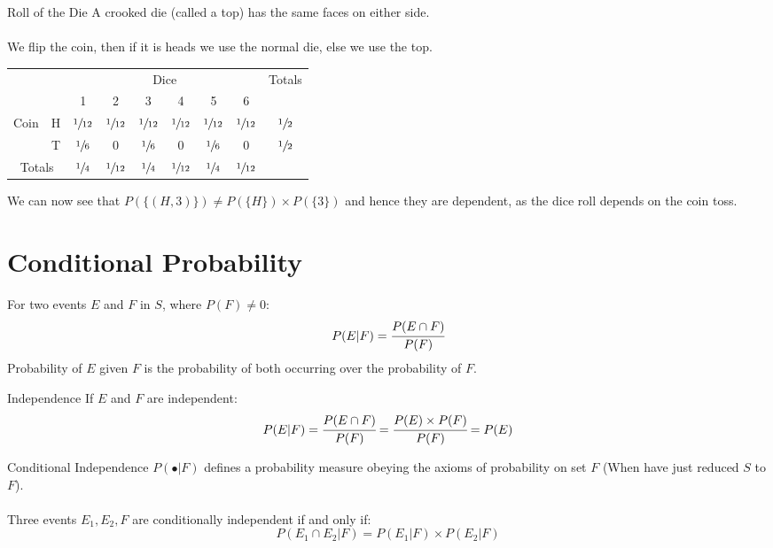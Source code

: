 \begin{examplebox}{Roll of the Die}
    A crooked die (called a top) has the same faces on either side.
    \\
    \\ We flip the coin, then if it is heads we use the normal die, else we use the top.
    \begin{center}
        \begin{tabular}{c c c c c c c c c}
            \setlength{\tabcolsep}{3em}
                                    &                & \multicolumn{6}{c}{Dice} & \multirow{2}{*}{Totals}                                                                                          \\
                                    &                & 1                        & 2                       & 3               & 4               & 5               & 6               &                \\
            \multirow{2}{*}{Coin}      & H              & $\sfrac{1}{12}$          & $\sfrac{1}{12}$         & $\sfrac{1}{12}$ & $\sfrac{1}{12}$ & $\sfrac{1}{12}$ & $\sfrac{1}{12}$ & $\sfrac{1}{2}$ \\
                                    & T              & $\sfrac{1}{6}$           & $0$                     & $\sfrac{1}{6}$  & $0$             & $\sfrac{1}{6}$  & $0$             & $\sfrac{1}{2}$ \\
            \multicolumn{2}{c}{Totals} & $\sfrac{1}{4}$ & $\sfrac{1}{12}$          & $\sfrac{1}{4}$          & $\sfrac{1}{12}$ & $\sfrac{1}{4}$  & $\sfrac{1}{12}$ &                                  \\
        \end{tabular}
    \end{center}
    We can now see that $P(\{(H,3)\}) \neq P(\{H\}) \times P(\{3\})$ and hence they are dependent, as the dice roll depends on the coin toss.
\end{examplebox}

\section{Conditional Probability}
For two events $E$ and $F$ in  $S$, where $P(F) \neq 0$:
\[P(E|F) = \cfrac{P(E \cap F)}{P(F)}\]
Probability of $E$ given $F$ is the probability of both occurring over the probability of $F$.
\begin{sidenotebox}{Independence}
    If $E$ and $F$ are independent:
    \[P(E|F) = \cfrac{P(E \cap F)}{P(F)} = \cfrac{P(E) \times P(F)}{P(F)} = P(E)\]
\end{sidenotebox}
\begin{definitionbox}{Conditional Independence}
	$P(\bullet | F)$ defines a probability measure obeying the axioms of probability on set $F$ (When have just reduced $S$ to $F$).
	\\
	\\ Three events $E_1, E_2, F$ are conditionally independent if and only if:
	\[P(E_1 \cap E_2|F) = P(E_1|F) \times P(E_2|F)\]
\end{definitionbox}

